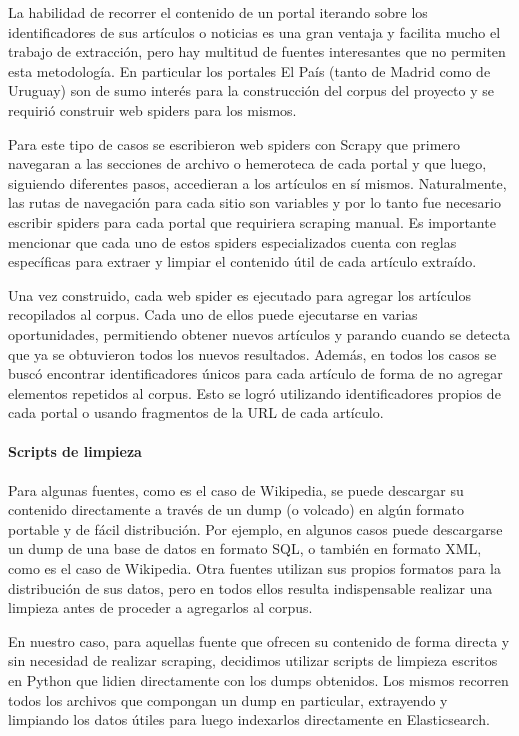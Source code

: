 La habilidad de recorrer el contenido de un portal iterando sobre los identificadores de sus artículos
o noticias es una gran ventaja y facilita mucho el trabajo de extracción, pero hay multitud de fuentes
interesantes que no permiten esta metodología. En particular los portales El País (tanto de Madrid
como de Uruguay) son de sumo interés para la construcción del corpus del proyecto y se requirió
construir web spiders para los mismos.

Para este tipo de casos se escribieron web spiders con Scrapy que primero navegaran a las
secciones de archivo o hemeroteca de cada portal y que luego, siguiendo diferentes pasos,
accedieran a los artículos en sí mismos. Naturalmente, las rutas de navegación para cada sitio
son variables y por lo tanto fue necesario escribir spiders para cada portal que requiriera
scraping manual. Es importante mencionar que cada uno de estos spiders especializados cuenta
con reglas específicas para extraer y limpiar el contenido útil de cada artículo extraído.

Una vez construido, cada web spider es ejecutado para agregar los artículos recopilados al corpus.
Cada uno de ellos puede ejecutarse en varias oportunidades, permitiendo obtener nuevos artículos y
parando cuando se detecta que ya se obtuvieron todos los nuevos resultados. Además, en todos
los casos se buscó encontrar identificadores únicos para cada artículo de forma de no agregar
elementos repetidos al corpus. Esto se logró utilizando identificadores propios de cada portal o usando
fragmentos de la URL de cada artículo.

\paragraph{Scripts de limpieza}

Para algunas fuentes, como es el caso de Wikipedia, se puede descargar su contenido directamente
a través de un dump (o volcado) en algún formato portable y de fácil distribución. Por ejemplo, en
algunos casos puede descargarse un dump de una base de datos en formato SQL, o también en
formato XML, como es el caso de Wikipedia. Otra fuentes utilizan sus propios formatos para la
distribución de sus datos, pero en todos ellos resulta indispensable realizar una limpieza antes
de proceder a agregarlos al corpus.

En nuestro caso, para aquellas fuente que ofrecen su contenido de forma directa y sin necesidad
de realizar scraping, decidimos utilizar scripts de limpieza escritos en Python que lidien directamente
con los dumps obtenidos. Los mismos recorren todos los archivos que compongan un dump en
particular, extrayendo y limpiando los datos útiles para luego indexarlos directamente en Elasticsearch.

